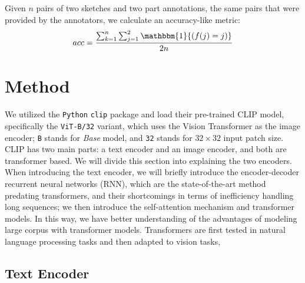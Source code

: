 Given $n$ pairs of two sketches and two part annotations, the same pairs that were provided by the annotators, we calculate an accuracy-like metric:
$$ acc = \frac{\sum_{k=1}^{n} \sum_{j=1}^2 \mathbbm{1}{(f(j) = j)}}{2n} $$

\section{Method}

We utilized the \texttt{Python} \texttt{clip} package and load their pre-trained CLIP model, specifically the \texttt{ViT-B/32} variant, which uses the Vision Transformer \citep{visiontransformer} as the image encoder; \texttt{B} stands for \textit{Base} model, and \texttt{32} stands for $32 \times 32$ input patch size. CLIP has two main parts: a text encoder and an image encoder, and both are transformer based. We will divide this section into explaining the two encoders. When introducing the text encoder, we will briefly introduce the encoder-decoder recurrent neural networks (RNN), which are the state-of-the-art method predating transformers, and their shortcomings in terms of inefficiency handling long sequences; we then introduce the self-attention mechanism and transformer models. In this way, we have better understanding of the advantages of modeling large corpus with transformer models. 
Transformers are first tested in natural language processing tasks and then adapted to vision tasks,

\subsection{Text Encoder}

